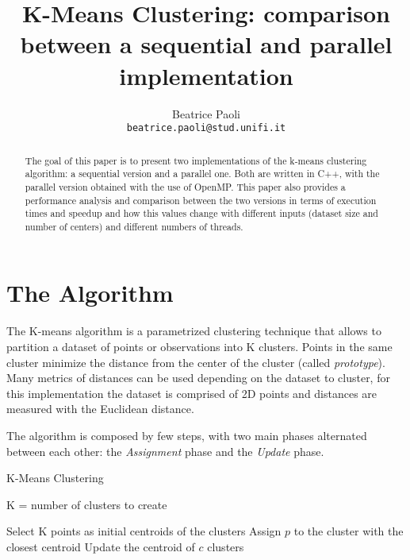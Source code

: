\documentclass[10pt,twocolumn,letterpaper]{article}
\begin{document}
\title{K-Means Clustering: comparison between a sequential and parallel implementation}

\author{Beatrice Paoli\\
{\tt\small beatrice.paoli@stud.unifi.it}
}

\maketitle
\thispagestyle{empty}

\begin{abstract}
	The goal of this paper is to present two implementations of the k-means clustering algorithm: a sequential version and a parallel one. Both are written in C++, with the parallel version obtained with the use of OpenMP. This paper also provides a performance analysis and comparison between the two versions in terms of execution times and speedup and how this values change with different inputs (dataset size and number of centers) and different numbers of threads. 
\end{abstract}


\section{The Algorithm}

The K-means algorithm is a parametrized clustering technique that allows to partition a dataset of points or observations into K clusters. Points in the same cluster minimize the distance from the center of the cluster (called \textit{prototype}). 
Many metrics of distances can be used depending on the dataset to cluster, for this implementation the dataset is comprised of 2D points and distances are measured with the Euclidean distance.

The algorithm is composed by few steps, with two main phases alternated between each other: the \textit{Assignment} phase and the \textit{Update} phase. %

\begin{algorithm}
	\label{alg:KMeansAlg}
	\caption{K-Means Clustering}
	\begin{algorithmic}
		\Require K = number of clusters to create
		\vspace{0.5cm}
		
		\State Select K points as initial centroids of the clusters
		\State Assign $p$ to the cluster with the closest centroid
		\EndFor
		\State Update the centroid of $c$
		\EndFor
		\EndWhile
		\State \Return clusters
		
	\end{algorithmic}
\end{algorithm}
\end{document}
